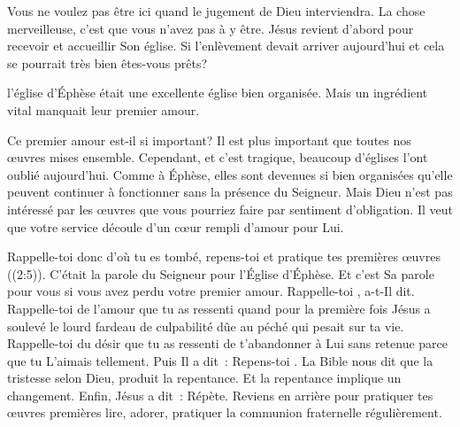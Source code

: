 Vous ne voulez pas être ici quand le jugement de Dieu interviendra.
 La chose merveilleuse, c'est que vous n'avez pas à y être.
 Jésus revient d'abord pour recevoir et accueillir Son église. 
 Si l'enlèvement devait arriver aujourd'hui
 \ocadr et cela se pourrait très bien \fcadr{} êtes-vous prêts? 

\dvrule






 l'église d'Éphèse était une excellente église bien organisée.
 Mais un ingrédient vital manquait \ocadr leur premier amour. 

Ce premier amour est-il si important?
 Il est plus important que toutes nos œuvres mises ensemble.
 Cependant, et c'est tragique,
 beaucoup d'églises l'ont oublié aujourd'hui.
 Comme à Éphèse, elles sont devenues si bien organisées
 qu'elle peuvent continuer à fonctionner sans la présence du Seigneur.
 Mais Dieu n'est pas intéressé par les œuvres que vous pourriez faire
 par sentiment d'obligation. Il veut que votre service découle
 d'un cœur rempli d'amour pour Lui. 


\og Rappelle-toi donc d'où tu es tombé, repens-toi
 et pratique tes premières œuvres \fg{} ((2:5)).
 C'était la parole du Seigneur pour l'Église d'Éphèse.
 Et c'est Sa parole pour vous si vous avez perdu votre premier amour.
 \og Rappelle-toi \fg{},  a-t-Il dit.
 Rappelle-toi de l'amour que tu as ressenti quand pour la première fois
 Jésus a soulevé le lourd fardeau de culpabilité dûe au péché
 qui pesait sur ta vie. Rappelle-toi du désir que tu as ressenti
 de t'abandonner à Lui sans retenue parce que tu L'aimais tellement.
 Puis Il a dit~:  \og Repens-toi \fg{}.
 La Bible nous dit que la tristesse selon Dieu, produit la repentance.
 Et la repentance implique un changement. Enfin, Jésus a dit~: 
 \og Répète. \fg{} Reviens en arrière pour pratiquer tes œuvres premières
 \ocadr lire, adorer, pratiquer la communion fraternelle régulièrement. 

